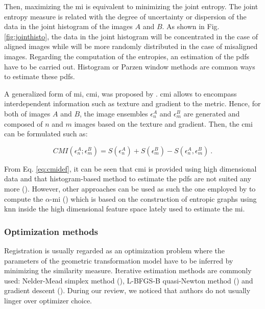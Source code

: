 Then, maximizing the \ac{mi} is equivalent to minimizing the joint entropy. The joint entropy measure is related with the degree of uncertainty or dispersion of the data in the joint histogram of the images $A$ and $B$. As shown in Fig. \ref{fig:jointhisto}, the data in the joint histogram will be concentrated in the case of aligned images while will be more randomly distributed in the case of misaligned images. Regarding the computation of the entropies, an estimation of the \acp{pdf} have to be carried out. Histogram or Parzen window methods are common ways to estimate these \acp{pdf}.

A generalized form of \ac{mi}, \ac{cmi}, was proposed by \cite{Chappelow2011}. \ac{cmi} allows to encompass interdependent information such as texture and gradient to the metric. Hence, for both of images $A$ and $B$, the image ensembles $\epsilon^{A}_n$ and $\epsilon^{B}_m$ are generated and composed of $n$ and $m$ images based on the texture and gradient. Then, the \ac{cmi} can be formulated such as:

\begin{equation}
	CMI(\epsilon^{A}_n;\epsilon^{B}_m) = S(\epsilon^{A}_n) + S(\epsilon^{B}_m) - S(\epsilon^{A}_n,\epsilon^{B}_m) \ .
	\label{eq:cmidef}
\end{equation}

From Eq. \eqref{eq:cmidef}, it can be seen that \ac{cmi} is provided using high dimensional data and that histogram-based method to estimate the \acp{pdf} are not suited any more (\cite{Chappelow2011}). However, other approaches can be used as such the one employed by \cite{Staring2009} to compute the $\alpha$-\ac{mi} (\cite{Hero2002}) which is based on the construction of entropic graphs using \ac{knn} inside the high dimensional feature space lately used to estimate the \ac{mi}.

\subsubsection{Optimization methods}\label{subsubsec:optmea}

Registration is usually regarded as an optimization problem where the parameters of the geometric transformation model have to be inferred by minimizing the similarity measure. Iterative estimation methods are commonly used: Nelder-Mead simplex method (\cite{Nelder1965}), L-BFGS-B quasi-Newton method (\cite{Byrd1995}) and gradient descent (\cite{Viola1997}). During our review, we noticed that authors do not usually linger over optimizer choice.

